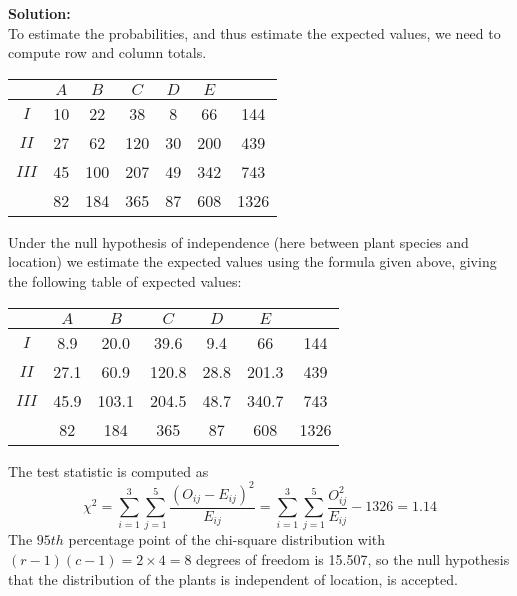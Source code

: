 \documentclass[12pt]{article}
\begin{document}
\begin{mdframed}
{\bf Solution:}\\
To estimate the probabilities, and thus estimate the expected values, we need to compute row and column totals.
\begin{center}
\begin{tabular}{|c|c|c|c|c|c|c|}
               \hline
                & $A$ & $B$ & $C$ & $D$ & $E$ & \\ \hline
               $I$ & 10 & 22 & 38 & 8 & 66 & 144\\
               $II$ & 27 & 62 & 120 & 30 & 200 & 439 \\
               $III$ & 45 & 100 & 207 & 49 & 342 &743\\ \hline
                & 82 & 184& 365 & 87 & 608 &1326\\
               \hline
\end{tabular}
\end{center}
Under the null hypothesis of independence (here between plant species and location) we estimate the expected values using the formula given above, giving the following table of expected values:
\begin{center}
\begin{tabular}{|c|c|c|c|c|c|c|}
               \hline
                & $A$ & $B$ & $C$ & $D$ & $E$ & \\ \hline
               $I$ & 8.9 & 20.0 & 39.6 & 9.4 & 66 & 144\\
               $II$ & 27.1 & 60.9 & 120.8 & 28.8 & 201.3 & 439 \\
               $III$ & 45.9 & 103.1 & 204.5 & 48.7 & 340.7 &743\\ \hline
                & 82 & 184& 365 & 87 & 608 &1326\\
               \hline
\end{tabular}
\end{center}

The test statistic is computed as
$$
\chi^{2}=\sum_{i=1}^{3}\sum_{j=1}^{5}\frac{(O_{ij}-E_{ij})^{2}}{E_{ij}}=\sum_{i=1}^{3}\sum_{j=1}^{5}\frac{O_{ij}^{2}}{E_{ij}}-1326=1.14
$$
The $95th$ percentage point of the chi-square distribution with $(r-1)(c-1)=2 \times 4 = 8$ degrees of freedom is 15.507, so the null hypothesis that the distribution of the plants is independent of location, is accepted.
\end{mdframed}
\end{document}
